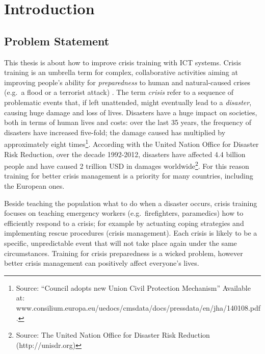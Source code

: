 \mainmatter

\chapter{Introduction}\label{introduction}

\section{Problem Statement}\label{problem-statement}

This thesis is about how to improve crisis training with ICT systems. Crisis training is an umbrella term for complex, collaborative activities aiming at improving people's ability for \emph{preparedness} to human and natural-caused crises (e.g.~a flood or a terrorist attack) \autocite{Lagadec:1997js}. The term \emph{crisis} refer to a sequence of problematic events that, if left unattended, might eventually lead to a \emph{disaster}, causing huge damage and loss of lives. Disasters have a huge impact on societies, both in terms of human lives and costs: over the last 35 years, the frequency of disasters have increased five-fold; the damage caused has multiplied by approximately eight times\footnote{Source: ``Council adopts new Union Civil Protection Mechanism'' Available at: www.consilium.europa.eu/uedocs/cmsdata/docs/pressdata/en/jha/140108.pdf.}. According with the United Nation Office for Disaster Risk Reduction, over the decade 1992-2012, disasters have affected 4.4 billion people and have caused 2 trillion USD in damages worldwide\footnote{Source: The United Nation Office for Disaster Risk Reduction (http://unisdr.org)}. For this reason training for better crisis management is a priority for many countries, including the European ones.

Beside teaching the population what to do when a disaster occurs, crisis training focuses on teaching emergency workers (e.g.~firefighters, paramedics) how to efficiently respond to a crisis; for example by actuating coping strategies and implementing rescue procedures (crisis management). Each crisis is likely to be a specific, unpredictable event that will not take place again under the same circumstances. Training for crisis preparedness is a wicked problem, however better crisis management can positively affect everyone's lives.

